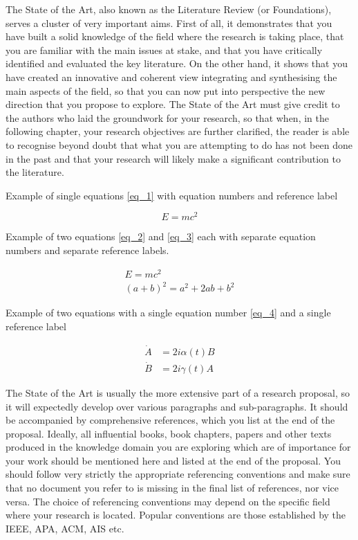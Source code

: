 The State of the Art, also known as the Literature Review (or Foundations), serves a cluster of very important aims. First of all, it demonstrates that you have built a solid knowledge of the field where the research is taking place, that you are familiar with the main issues at stake, and that you have critically identified and evaluated the key
literature. On the other hand, it shows that you have created an innovative and coherent view integrating and synthesising the main aspects of the field, so that you can now put into perspective the new direction that you propose to explore. The State of the Art must give credit to the authors who laid the groundwork for your research, so that when, in the following chapter, your research objectives are further clarified, the reader is able to recognise beyond doubt that what you are attempting to do has not been done in the past and that your research will likely make a significant contribution to the literature.

Example of single equations \eqref{eq_1} with equation numbers and reference label

\begin{equation}
    E=mc^2 \label{eq_1}
\end{equation}

Example of two equations \eqref{eq_2} and \eqref{eq_3} each with separate equation numbers and separate reference labels.

\begin{gather}
    E=mc^2 \label{eq_2}\\
    (a+b)^2 = a^2 + 2ab + b^2 \label{eq_3}
\end{gather}


Example of two equations with a single equation number \eqref{eq_4} and a single reference label

\begin{equation}
    \begin{aligned}
    \dot{A} &  =2i\alpha(t)B\\
    \dot{B} &  =2i\gamma(t)A
    \end{aligned}
    \label{eq_4}
\end{equation}


The State of the Art is usually the more extensive part of a research proposal, so it will expectedly develop over various paragraphs and sub-paragraphs. It should be accompanied by comprehensive references, which you list at the end of the proposal. Ideally, all influential books, book chapters, papers and other texts produced in the knowledge domain you are exploring which are of importance for your work should be mentioned here and listed at the end of the proposal. You should follow very strictly the appropriate referencing conventions and make sure that no document you refer to is missing in the final list of references, nor vice versa. The choice of referencing conventions may depend on the specific field where your research is located. Popular conventions are those established by the \ac{IEEE}, \ac{APA}, \ac{ACM}, \ac{AIS} etc.



